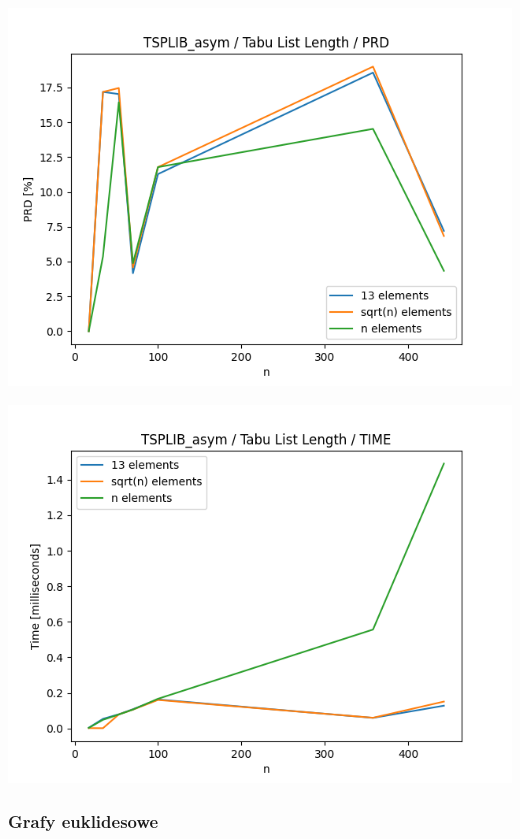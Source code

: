 \documentclass{article}
\begin{document}
\begin{center}
\includegraphics[width=\textwidth, 
                   height = 0.4\textheight, 
                   keepaspectratio]
                  {plots/tabu_tsplib_asym_prd} 
\end{center}

\begin{center}
\includegraphics[width=\textwidth, 
                   height = 0.4\textheight, 
                   keepaspectratio]
                  {plots/tabu_tsplib_asym_time} 
\end{center}

\subsubsection{Grafy euklidesowe}
\end{document}
